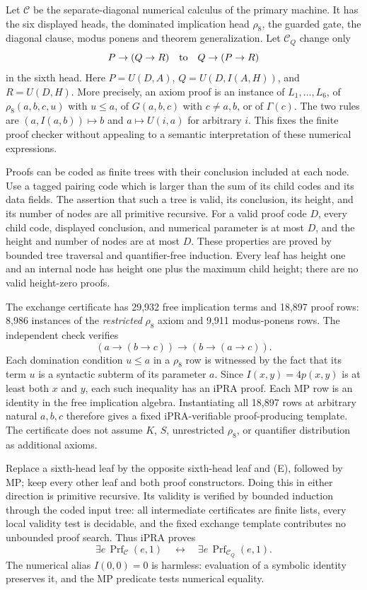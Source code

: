 Let $\mathcal C$ be the separate-diagonal numerical calculus of the
primary machine.  It has the six displayed heads, the dominated
implication head $\rho_8$, the guarded gate, the diagonal clause, modus
ponens and theorem generalization.  Let $\mathcal C_Q$ change only
\[
 P\to(Q\to R)\quad\hbox{to}\quad Q\to(P\to R)
\]
in the sixth head.  Here $P=U(D,A)$, $Q=U(D,I(A,H))$, and $R=U(D,H)$.
More precisely, an axiom proof is an instance of $L_1,\ldots,L_6$,
of $\rho_8(a,b,c,u)$ with $u\leq a$, of $G(a,b,c)$ with
$c\ne a,b$, or of $\Gamma(c)$.  The two rules are
$(a,I(a,b))\mapsto b$ and $a\mapsto U(i,a)$ for arbitrary $i$.
This fixes the finite proof checker without appealing to a semantic
interpretation of these numerical expressions.

Proofs can be coded as finite trees with their conclusion included at
each node.  Use a tagged pairing code which is larger than the sum of
its child codes and its data fields.  The assertion that such a tree
is valid, its conclusion, its height, and its number of nodes are all
primitive recursive.  For a valid proof code $D$, every child code,
displayed conclusion, and numerical parameter is at most $D$, and the
height and number of nodes are at most $D$.  These properties are
proved by bounded tree traversal and quantifier-free induction.
Every leaf has height one and an internal node has height one plus
the maximum child height; there are no valid height-zero proofs.

The exchange certificate has 29,932 free implication terms and 18,897
proof rows: 8,986 instances of the \emph{restricted} $\rho_8$ axiom
and 9,911 modus-ponens rows.  The independent check verifies
\[
 (a\to(b\to c))\to(b\to(a\to c)).                 \tag{E}
\]
Each domination condition $u\leq a$ in a $\rho_8$ row is witnessed
by the fact that its term $u$ is a syntactic subterm of its parameter
$a$.  Since $I(x,y)=4p(x,y)$ is at least both $x$ and $y$, each such
inequality has an iPRA proof.  Each MP row is an identity in the free
implication algebra.  Instantiating all 18,897 rows at arbitrary natural
$a,b,c$ therefore gives a fixed iPRA-verifiable proof-producing template.
The certificate does not assume $K$, $S$, unrestricted $\rho_8$, or
quantifier distribution as additional axioms.

Replace a sixth-head leaf by the opposite sixth-head leaf and (E),
followed by MP; keep every other leaf and both proof constructors.
Doing this in either direction is primitive recursive.  Its validity
is verified by bounded induction through the coded input tree: all
intermediate certificates are finite lists, every local validity test
is decidable, and the fixed exchange template contributes no unbounded
proof search.  Thus iPRA proves
\[
 \exists e\,\operatorname{Prf}_{\mathcal C}(e,1)
 \quad\longleftrightarrow\quad
 \exists e\,\operatorname{Prf}_{\mathcal C_Q}(e,1).       \tag{1}
\]
The numerical alias $I(0,0)=0$ is harmless: evaluation of a symbolic
identity preserves it, and the MP predicate tests numerical equality.

